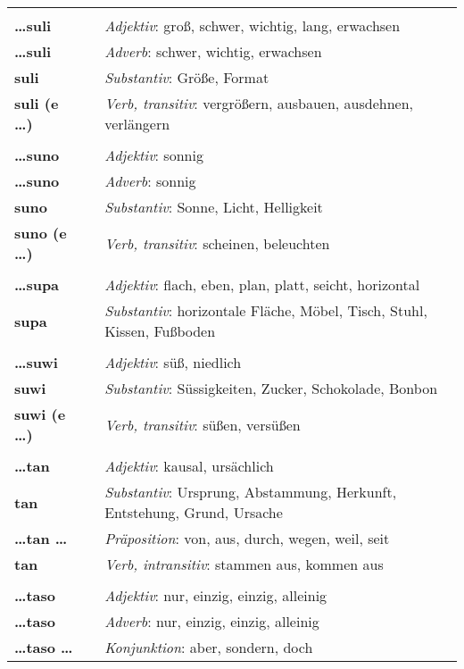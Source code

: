 \begin{supertabular}{p{2,5cm}|ll}
 && \\ %
\textbf{\dots suli} && \textit{Adjektiv}: groß, schwer, wichtig, lang, erwachsen \\ 
\textbf{\dots suli} && \textit{Adverb}: schwer, wichtig, erwachsen \\ 
\textbf{suli} && \textit{Substantiv}: Größe, Format \\ 
\textbf{suli (e \dots)} && \textit{Verb, transitiv}: vergrößern, ausbauen, ausdehnen, verlängern \\ 
 && \\ %
\textbf{\dots suno} && \textit{Adjektiv}: sonnig \\ 
\textbf{\dots suno} && \textit{Adverb}: sonnig \\ 
\textbf{suno} && \textit{Substantiv}: Sonne, Licht, Helligkeit \\ 
\textbf{suno (e \dots)} && \textit{Verb, transitiv}: scheinen, beleuchten \\ 
 && \\ %
\textbf{\dots supa} && \textit{Adjektiv}: flach, eben, plan, platt, seicht, horizontal \\ 
\textbf{supa} && \textit{Substantiv}: horizontale Fläche, Möbel, Tisch, Stuhl, Kissen, Fußboden \\ 
 && \\ %
\textbf{\dots suwi} && \textit{Adjektiv}: süß, niedlich \\ 
\textbf{suwi} && \textit{Substantiv}: Süssigkeiten, Zucker, Schokolade, Bonbon \\ 
\textbf{suwi (e \dots)} && \textit{Verb, transitiv}: süßen, versüßen \\ 
 && \\ %
\textbf{\dots tan} && \textit{Adjektiv}: kausal, ursächlich \\ 
\textbf{tan} && \textit{Substantiv}: Ursprung, Abstammung, Herkunft, Entstehung, Grund, Ursache \\ 
\textbf{\dots tan \dots} && \textit{Präposition}: von, aus, durch, wegen, weil, seit \\ 
\textbf{tan} && \textit{Verb, intransitiv}: stammen aus, kommen aus \\ 
 && \\ %
\textbf{\dots taso} && \textit{Adjektiv}: nur, einzig, einzig, alleinig \\ 
\textbf{\dots taso} && \textit{Adverb}: nur, einzig, einzig, alleinig \\ 
\textbf{\dots taso \dots} && \textit{Konjunktion}: aber, sondern, doch \\ 

\end{supertabular}
